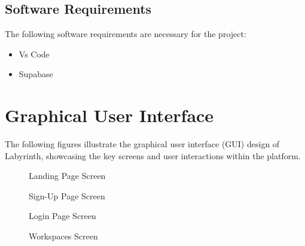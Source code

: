 \documentclass{FastFyp}
\begin{document}
\subsection{Software Requirements}
The following software requirements are necessary for the project:
\begin{itemize}
    \item Vs Code
    \item Supabase
    
\end{itemize}



\section{Graphical User Interface}
The following figures illustrate the graphical user interface (GUI) design of Labyrinth, showcasing the key screens and user interactions within the platform.

\begin{figure} [!h]
    \centering
    
    \caption{Landing Page Screen}
    \label{fig:landing_page}
\end{figure}

\begin{figure} [!h]
    \centering
    
    \caption{Sign-Up Page Screen}
    \label{fig:sign_up}
\end{figure}

\begin{figure} [!h]
    \centering
    
    \caption{Login Page Screen}
    \label{fig:login}
\end{figure}

\begin{figure} [!h]
    \centering
     
    \caption{Workspaces Screen}
    \label{fig:workspaces}
\end{figure}
\end{document}
